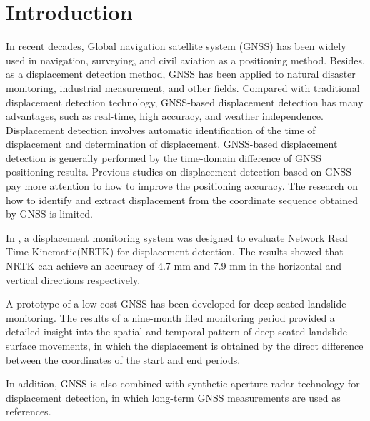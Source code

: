 \documentclass{svjour3}                     %
\begin{document}
\section{Introduction}
\label{intro}
In recent decades, Global navigation satellite system (GNSS) has been widely used in navigation, surveying, and civil aviation as a positioning method\citep{teunissen2017springer}. 
Besides, as a displacement detection method, GNSS has been applied to natural disaster monitoring\citep{awange2012environmental}, industrial measurement\citep{pavasovic2011application}, and other fields. 
Compared with traditional displacement detection technology, GNSS-based displacement detection has many advantages, such as real-time, high accuracy, and weather independence\citep{shen2019a}. 
Displacement detection involves automatic identification of the time of displacement and determination of displacement. 
GNSS-based displacement detection is generally performed by the time-domain difference of GNSS positioning results. 
Previous studies on displacement detection based on GNSS pay more attention to how to improve the positioning accuracy. The research on how to identify and extract displacement from the coordinate sequence obtained by GNSS is limited.

In \cite{GUMUS2019131}, a displacement monitoring system was designed to evaluate Network Real Time Kinematic(NRTK) for displacement detection. The results showed that NRTK can achieve an accuracy of 4.7 mm and 7.9 mm in the horizontal and vertical directions respectively.

A prototype of a low-cost GNSS has been developed for deep-seated landslide monitoring\citep{rs12203375}. The results of a nine-month filed monitoring period provided a detailed insight into the spatial and temporal pattern of deep-seated landslide surface movements, in which the displacement is obtained by the direct difference between the coordinates of the start and end periods.

In addition, GNSS is also combined with synthetic aperture radar technology for displacement detection, in which long-term GNSS measurements are used as references\citep{atanasova2018ground,fuhrmann2015estimation}.
\end{document}
